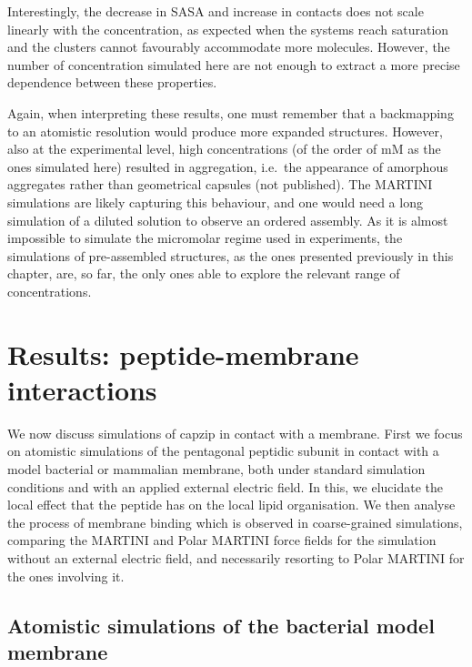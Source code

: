 Interestingly, the decrease in SASA and increase in contacts does not scale linearly with the concentration, as expected when the systems reach saturation and the clusters cannot favourably accommodate more molecules. However, the number of concentration simulated here are not enough to extract a more precise dependence between these properties.

Again, when interpreting these results, one must remember that a backmapping to an atomistic resolution would produce more expanded structures. However, also at the experimental level, high concentrations (of the order of mM as the ones simulated here) resulted in aggregation, i.e.\ the appearance of amorphous aggregates rather than geometrical capsules (not published). The MARTINI simulations are likely capturing this behaviour, and one would need a long simulation of a diluted solution to observe an ordered assembly. As it is almost impossible to simulate the micromolar regime used in experiments, the simulations of pre-assembled structures, as the ones presented previously in this chapter, are, so far, the only ones able to explore the relevant range of concentrations.


\section{Results: peptide-membrane interactions}

We now discuss simulations of capzip in contact with a membrane. First we focus on atomistic simulations of the pentagonal peptidic subunit in contact with a model bacterial or mammalian membrane, both under standard simulation conditions and with an applied external electric field. In this, we elucidate the local effect that the peptide has on the local lipid organisation.
%
We then analyse the process of membrane binding which is observed in coarse-grained simulations, comparing the MARTINI and Polar MARTINI force fields for the simulation without an external electric field, and necessarily resorting to Polar MARTINI for the ones involving it. 


\subsection{Atomistic simulations of the bacterial model membrane} \label{sec:lip_atom_bact}

